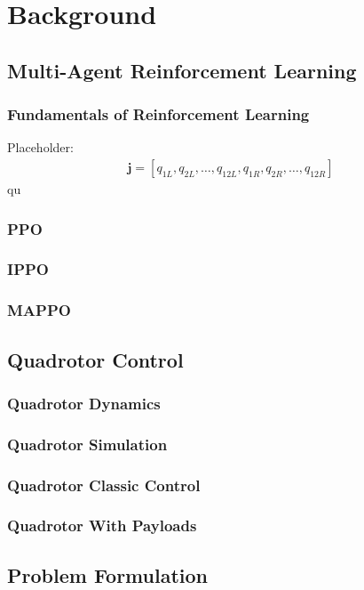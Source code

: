 \chapter{Background}

\section{Multi-Agent Reinforcement Learning}



\subsection{Fundamentals of Reinforcement Learning}
Placeholder:
\begin{equation}
    \begin{split}
        \bm{j} =
        [q_{1L},q_{2L}, \dots ,q_{12L},q_{1R},q_{2R}, \dots ,q_{12R}]
    \end{split}
\end{equation}
qu

\subsection{PPO}
\subsection{IPPO}
\subsection{MAPPO}

\section{Quadrotor Control}
\subsection{Quadrotor Dynamics}
\subsection{Quadrotor Simulation}
\subsection{Quadrotor Classic Control}
\subsection{Quadrotor With Payloads}

\section{Problem Formulation}


